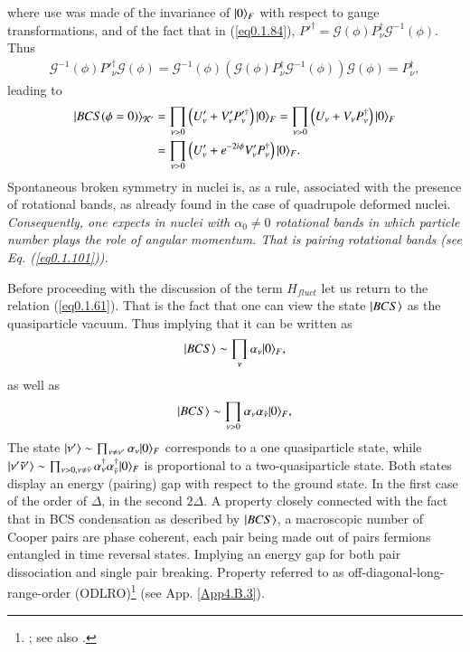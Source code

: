 where use was made of the invariance of $|{0} \rangle_F$ with respect to gauge transformations, and of the fact that in (\ref{eq0.1.84}), $P'^\dagger=\mathcal G(\phi)P^\dagger_\nu\mathcal G^{-1}(\phi)$. Thus 
\begin{align}\label{eq0.1.89}
\mathcal G^{-1}(\phi)P'^\dagger_\nu\mathcal G(\phi)=\mathcal G^{-1}(\phi)\left(\mathcal G(\phi)P^\dagger_\nu\mathcal G^{-1}(\phi)\right)\mathcal G(\phi)=P^\dagger_\nu,
\end{align}
leading to
\begin{align}\label{eq0.1.90}
\nonumber|{BCS(\phi=0)} \rangle_{\mathcal K'}&=\prod_{\nu>0}\left(U'_\nu+V'_\nu P'^\dagger_\nu\right)|{0} \rangle_F=\prod_{\nu>0}\left(U_\nu+V_\nu P^\dagger_\nu\right)|{0} \rangle_F\\
&=\prod_{\nu>0}\left(U'_\nu+e^{-2i\phi}V'_\nu P^\dagger_\nu\right)|{0} \rangle_F.
\end{align}
Spontaneous broken symmetry in nuclei is, as a rule, associated with the presence of rotational bands, as already found in the case of quadrupole deformed nuclei. \textit{Consequently, one expects in nuclei with $\alpha_0\neq0$ rotational bands in which particle number plays the role of angular momentum. That is pairing rotational bands (see Eq. (\ref{eq0.1.101})).}


Before proceeding with the discussion of the term $H_{fluct}$ let us return to the relation (\ref{eq0.1.61}). That is the fact that one can view the state $|{BCS} \rangle$ as the quasiparticle vacuum. Thus implying  that it can be written as
\begin{align}\label{eq1.4.57}
|{BCS} \rangle\sim\prod_{\nu}\alpha_\nu|{0} \rangle_F,
\end{align}
as well as
\begin{align}\label{eq1.4.58}
|{BCS} \rangle\sim\prod_{\nu>0}\alpha_\nu\alpha_{\tilde\nu}|{0} \rangle_F,
\end{align}
The state $|{\nu'} \rangle\sim\prod_{\nu\neq\nu'}\alpha_\nu|{0} \rangle_F$ corresponds to a one quasiparticle state, while $|{\nu'\tilde\nu'} \rangle\sim\prod_{\nu>0,\nu\neq\tilde\nu}\alpha_\nu^\dagger\alpha_{\tilde\nu}^\dagger|{0} \rangle_F$ is proportional to a two-quasiparticle state. Both states display an energy (pairing) gap with respect to the ground state. In the first case of the order of $\Delta$, in the second $2\Delta$. A property closely connected with the fact that in BCS condensation as described by $|{BCS} \rangle$, a macroscopic number of Cooper pairs are phase coherent, each pair being made out of pairs fermions entangled in time reversal states. Implying an energy gap for both pair dissociation and single pair breaking. Property referred to as off-diagonal-long-range-order (ODLRO)\footnote{\label{f37c1} \cite{Penrose:51,Penrose:56,Yang:62}; see also \cite{Anderson:96}.} (see App. \ref{App4.B.3}).


